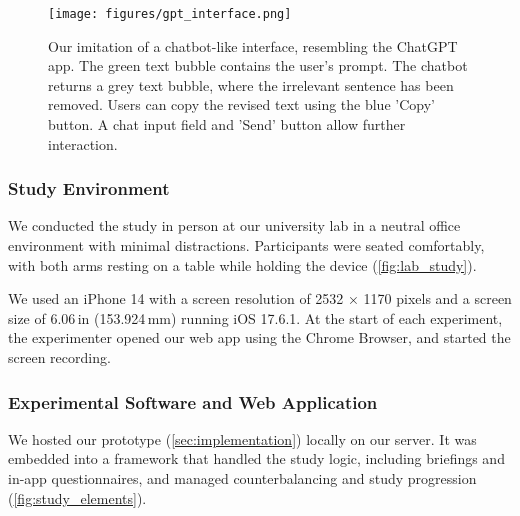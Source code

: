 \begin{figure}
    \centering
    \texttt{[image: figures/gpt\_interface.png]}
    \caption{Our imitation of a chatbot-like interface, resembling the ChatGPT app. The green text bubble contains the user's prompt. The chatbot returns a grey text bubble, where the irrelevant sentence has been removed. Users can copy the revised text using the blue 'Copy' button. A chat input field and 'Send' button allow further interaction.}
    \label{fig:gpt_interface}
\end{figure}

\subsubsection{Study Environment}
We conducted the study in person at our university lab in a neutral office environment with minimal distractions. 
Participants were seated comfortably, with both arms resting on a table while holding the device (\cref{fig:lab_study}).

We used an iPhone 14 with a screen resolution of 2532 × 1170 pixels and a screen size of 6.06\,in (153.924\,mm) running iOS 17.6.1. 
At the start of each experiment, the experimenter opened our web app using the Chrome Browser, and started the screen recording.

\subsubsection{Experimental Software and Web Application} %
We hosted our prototype (\cref{sec:implementation}) locally on our server. 
It was embedded into a framework that handled the study logic, including briefings and in-app questionnaires, and managed counterbalancing and study progression (\cref{fig:study_elements}). %

